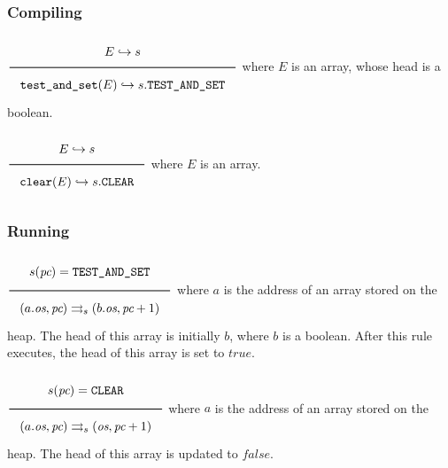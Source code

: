 \subsubsection{Compiling}
\label{sec:org025d9fd}
\(\Rule{E \translateaux s}{\texttt{test\_and\_set}(E) \translateaux s.\texttt{TEST\_AND\_SET}}\\\)
where \(E\) is an array, whose head is a boolean.

\(\Rule{E \translateaux s}{\texttt{clear}(E) \translateaux s.\texttt{CLEAR}}\\\)
where \(E\) is an array.

\subsubsection{Running}
\label{sec:org6d01845}
\(\Rule{s(\textit{pc}) = \texttt{TEST\_AND\_SET}}{(a.\textit{os},\textit{pc}) \transition (b.\textit{os},\textit{pc} + 1)}\\\)
where \(a\) is the address of an array stored on the heap. The head of this array is initially \(b\), where \(b\) is a boolean. After this rule executes, the head of this array is set to \(\textit{true}\).

\(\Rule{s(\textit{pc}) = \texttt{CLEAR}}{(a.\textit{os},\textit{pc}) \transition (\textit{os},\textit{pc} + 1)}\\\)
where \(a\) is the address of an array stored on the heap. The head of this array is updated to \(\textit{false}\).
